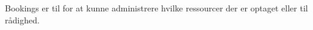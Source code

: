 


Bookings er til for at kunne administrere hvilke ressourcer der er optaget eller til rådighed.
\\


